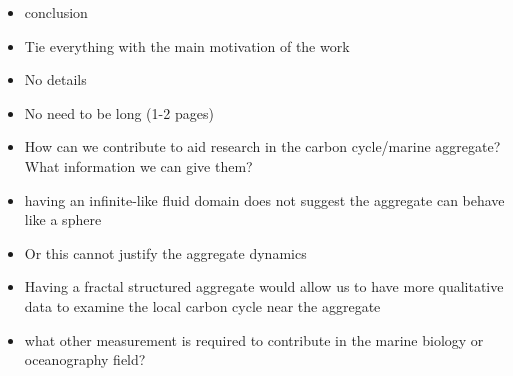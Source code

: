 \begin{itemize}
  \item conclusion
  \item Tie everything with the main motivation of the work
  \item No details
  \item No need to be long (1-2 pages)
  \item How can we contribute to aid research in the carbon cycle/marine aggregate? What information we can give them?
  \item having an infinite-like fluid domain does not suggest the aggregate can behave like a sphere
  \item Or this cannot justify the aggregate dynamics 
  \item Having a fractal structured aggregate would allow us to have more qualitative data to examine the local carbon cycle near the aggregate
  \item what other measurement is required to contribute in the marine biology or oceanography field?
\end{itemize}